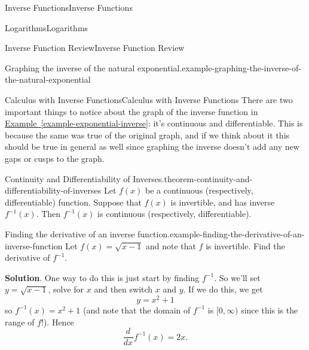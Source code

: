 \documentclass[10pt,]{book}
\numberwithin{equation}{section}
\newcommand{\dv}[3][]{\dfrac{d^{#1} #2}{d #3^{#1}}}
\begin{document}
\begin{chapterptx}{Inverse Functions}{}{Inverse Functions}{}{}
\begin{sectionptx}{Logarithms}{}{Logarithms}{}{}
\begin{subsectionptx}{Inverse Function Review}{}{Inverse Function Review}{}{}
\begin{example}{Graphing the inverse of the natural exponential.}{example-graphing-the-inverse-of-the-natural-exponential}
\begin{figure}
{
}
\end{figure}
\end{example}
\end{subsectionptx}
%
%
\typeout{************************************************}
\typeout{************************************************}
%
\begin{subsectionptx}{Calculus with Inverse Functions}{}{Calculus with Inverse Functions}{}{}\label{subsection-calculus-with-inverse-functions}
\hypertarget{p-206}{}%
There are two important things to notice about the graph of the inverse function in \hyperref[example-exponential-inverse]{Example~\ref{example-exponential-inverse}}: it's continuous and differentiable. This is because the same was true of the original graph, and if we think about it this should be true in general as well since graphing the inverse doesn't add any new gaps or cusps to the graph.%
\begin{theorem}{Continuity and Differentiability of Inverses.}{}{theorem-continuity-and-differentiability-of-inverses}%
\hypertarget{p-207}{}%
Let \(f(x)\) be a continuous (respectively, differentiable) function. Suppose that \(f(x)\) is invertible, and has inverse \(f^{-1}(x)\). Then \(f^{-1}(x)\) is continuous (respectively, differentiable).%
\end{theorem}
\begin{example}{Finding the derivative of an inverse function.}{example-finding-the-derivative-of-an-inverse-function}%
\hypertarget{p-208}{}%
Let \(f(x) = \sqrt{x-1}\) and note that \(f\) is invertible. Find the derivative of \(f^{-1}\).%
\par\smallskip%
\noindent\textbf{Solution}.\hypertarget{solution-45}{}\quad%
\hypertarget{p-209}{}%
One way to do this is just start by finding \(f^{-1}\). So we'll set \(y = \sqrt{x-1}\), solve for \(x\) and then switch \(x\) and \(y\). If we do this, we get%
\begin{equation*}
y = x^{2} + 1
\end{equation*}
so \(f^{-1}(x) = x^{2} + 1\) (and note that the domain of \(f^{-1}\) is \([0,\infty)\) since this is the range of \(f\)!). Hence%
\begin{equation*}
\dv{}{x}f^{-1}(x) = 2x.
\end{equation*}
%
\end{example}

\end{subsectionptx}
\end{sectionptx}
\end{chapterptx}
\end{document}
